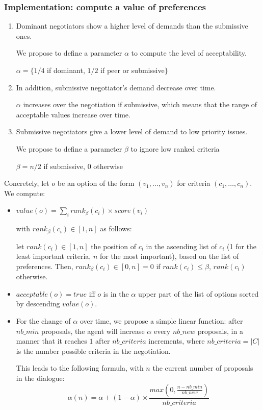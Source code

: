 \documentclass{article}
\begin{document}
\subsubsection{Implementation: compute a value of preferences}
\begin{enumerate}
	\item Dominant negotiators show a higher level of demands than the submissive ones.
	
	We propose to define a parameter $\alpha$ to compute the level of acceptability.
	
	$\alpha = \{ 1/4$ if dominant, $1/2$ if peer or submissive$\}$ 
	
	\item In addition, submissive negotiator's demand decrease over time. 
	
	$ \alpha$ increases over the negotiation if submissive, which means that the range of acceptable values increase over time.
	
	\item Submissive negotiators give a lower level of demand to low priority issues.
	
	We propose to define a parameter $\beta$ to ignore low ranked criteria 
	
	$\beta = n/2$ if submissive, $0$ otherwise
\end{enumerate}

Concretely, let $o$ be an option of the form $(v_1,\ldots,v_n)$ for criteria $(c_1,\ldots,c_n)$. We compute:
\begin{itemize}
	\item $value(o) = \sum_i rank_\beta(c_i)\times score(v_i)$
	
	with $rank_\beta(c_i)\in[1,n]$ as follows:
	
	let $rank(c_i)\in[1,n]$ the position of $c_i$ in the ascending list of $c_i$ (1 for the least important criteria, $n$ for the most important), based on the list of preferences. Then, $rank_\beta(c_i)\in[0,n] = 0$ if $rank(c_i)\leq \beta$, $rank(c_i)$ otherwise.
	
	\item $acceptable(o) = true$ iff $o$ is in the $\alpha$ upper part of the list of options sorted by descending $value(o)$.
	\item For the change of $\alpha$ over time, we propose a simple linear function: after $nb\_min$ proposals, the agent will increase $\alpha$ every $nb\_new$ proposals, in a manner that it reaches $1$ after $nb\_criteria$ increments, where $nb\_criteria = |C|$ is the number possible criteria in the negotiation.
	
	This leads to the following formula, with $n$ the current number of proposals in the dialogue:
	$$\alpha(n) = \alpha + (1-\alpha)\times\frac{max(0,\frac{n-nb\_min}{nb\_new})}{nb\_criteria}$$
\end{itemize}
\end{document}
